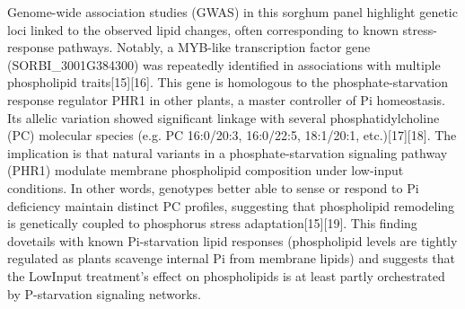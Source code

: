 \documentclass[10pt,letterpaper]{article}
\begin{document}
Genome-wide association studies (GWAS) in this sorghum panel highlight genetic loci linked to the observed lipid changes, often corresponding to known stress-response pathways. Notably, a MYB-like transcription factor gene (SORBI\_3001G384300) was repeatedly identified in associations with multiple phospholipid traits[15][16]. This gene is homologous to the phosphate-starvation response regulator PHR1 in other plants, a master controller of Pi homeostasis. Its allelic variation showed significant linkage with several phosphatidylcholine (PC) molecular species (e.g. PC 16:0/20:3, 16:0/22:5, 18:1/20:1, etc.)[17][18]. The implication is that natural variants in a phosphate-starvation signaling pathway (PHR1) modulate membrane phospholipid composition under low-input conditions. In other words, genotypes better able to sense or respond to Pi deficiency maintain distinct PC profiles, suggesting that phospholipid remodeling is genetically coupled to phosphorus stress adaptation[15][19]. This finding dovetails with known Pi-starvation lipid responses (phospholipid levels are tightly regulated as plants scavenge internal Pi from membrane lipids) and suggests that the LowInput treatment’s effect on phospholipids is at least partly orchestrated by P-starvation signaling networks.
\end{document}

